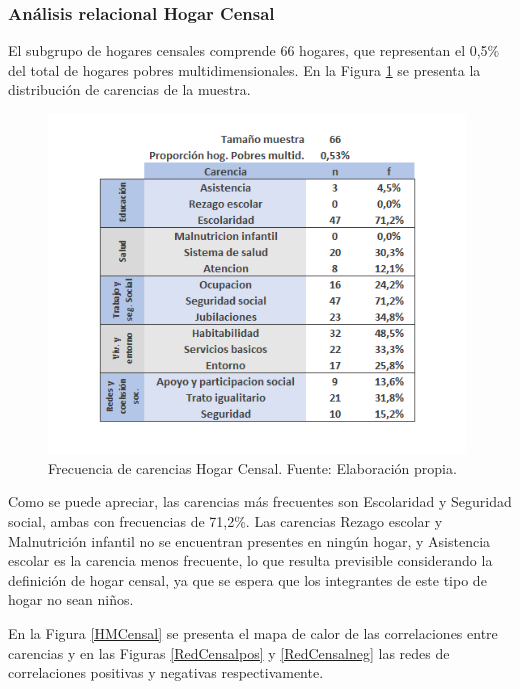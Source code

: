 \documentclass[12pt,letterpaper,spanish]{article}
\begin{document}
\subsubsection{Análisis relacional Hogar Censal}
El subgrupo de hogares censales comprende 66 hogares, que representan el 0,5\% del total de hogares pobres multidimensionales. En la Figura \ref{freCensal} se presenta la distribución de carencias de la muestra.
\begin{figure}[H]
  \centering
    \includegraphics[height=9cm]{HOGARES/tabla_censal.png}
    \caption{Frecuencia de carencias Hogar Censal. Fuente: Elaboración propia.}
    \label{freCensal}
\end{figure}
Como se puede apreciar, las carencias más frecuentes son Escolaridad y Seguridad social, ambas con frecuencias de 71,2\%. Las carencias Rezago escolar y Malnutrición infantil no se encuentran presentes en ningún hogar, y Asistencia escolar es la carencia menos frecuente, lo que resulta previsible considerando la definición de hogar censal, ya que se espera que los integrantes de este tipo de hogar no sean niños. 

En la Figura \ref{HMCensal} se presenta el mapa de calor de las correlaciones entre carencias y en las Figuras \ref{RedCensalpos} y \ref{RedCensalneg} las redes de correlaciones positivas y negativas respectivamente.
\end{document}
